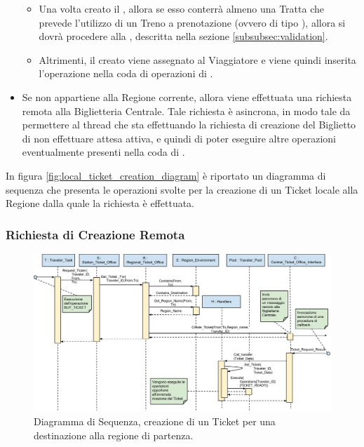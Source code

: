 \begin{itemize}
\begin {itemize}
\begin{itemize}
\begin{verbatim}
						\end{verbatim}
						\item $i$ viene incrementato di $Max\_Length$, per poter procedere all'individuazione della prossima corrispondenza di lunghezza massima.
					\end{itemize} 
			\item Una volta creato il , allora se esso conterrà almeno una Tratta che prevede l'utilizzo di un Treno a prenotazione (ovvero di tipo ), allora si dovrà procedere alla , descritta nella sezione \ref{subsubsec:validation}.
			\item Altrimenti, il  creato viene assegnato al Viaggiatore e viene quindi inserita l'operazione  nella coda di operazioni di .
			\end {itemize} 
		\item Se  non appartiene alla Regione corrente, allora viene effettuata una richiesta remota alla Biglietteria Centrale. Tale richiesta è asincrona, in modo tale da permettere al thread che sta effettuando la richiesta di creazione del Biglietto di non effettuare attesa attiva, e quindi di poter eseguire altre operazioni eventualmente presenti nella coda di .
	\end{itemize} 
	
	In figura \ref{fig:local_ticket_creation_diagram} è riportato un diagramma di sequenza che presenta le operazioni svolte per la creazione di un Ticket locale alla Regione dalla quale la richiesta è effettuata. 


	\subsubsection {Richiesta di Creazione Remota}\label{subsubsec:remote_ticket_creation}
	
	
	\begin{figure}[htbp]
		\includegraphics[trim = 65mm 0mm 0mm 0mm,scale=0.48]{imgs/Buy_Ticket_Sequence_Diagram_Remote.pdf}
		\caption{\footnotesize{Diagramma di Sequenza, creazione di un Ticket per una destinazione  alla regione di partenza.}}
		\label{fig:remote_ticket_creation_diagram}
	\end{figure}
	
